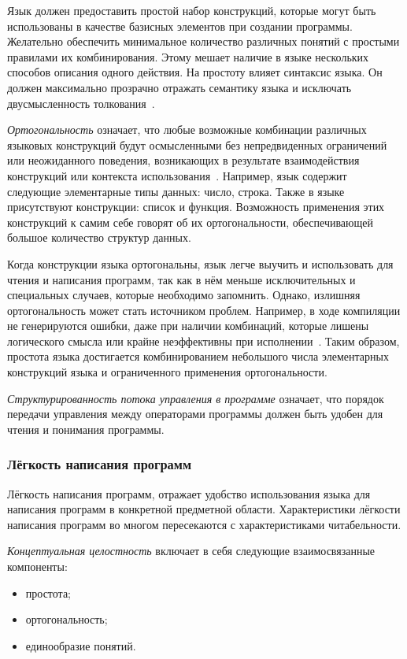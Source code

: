             Язык должен предоставить простой набор конструкций, которые могут быть использованы в качестве базисных элементов при создании программы.
            Желательно обеспечить минимальное количество различных понятий с простыми правилами их комбинирования.
            Этому мешает наличие в языке нескольких способов описания одного действия.
            На простоту влияет синтаксис языка.
            Он должен максимально прозрачно отражать семантику языка и исключать двусмысленность толкования~\cite{langs}.

            \textit{Ортогональность} означает, что любые возможные комбинации различных языковых конструкций будут осмысленными без непредвиденных ограничений или неожиданного поведения, возникающих в результате взаимодействия конструкций или контекста использования~\cite{langs}.
            Например, язык содержит следующие элементарные типы данных: число, строка.
            Также в языке присутствуют конструкции: список и функция.
            Возможность применения этих конструкций к самим себе говорят об их ортогональности, обеспечивающей большое количество структур данных.

            Когда конструкции языка ортогональны, язык легче выучить и использовать для чтения и написания программ, так как в нём меньше исключительных и специальных случаев, которые необходимо запомнить.
            Однако, излишняя ортогональность может стать источником проблем.
            Например, в ходе компиляции не генерируются ошибки, даже при наличии комбинаций, которые лишены логического смысла или крайне неэффективны при исполнении~\cite{langs}.
            Таким образом, простота языка достигается комбинированием небольшого числа элементарных конструкций языка и ограниченного применения ортогональности.

            \textit{Структурированность потока управления в программе} означает, что порядок передачи управления между операторами программы должен быть удобен для чтения и понимания программы.

        \subsubsection{Лёгкость написания программ}
            Лёгкость написания программ, отражает удобство использования языка для написания программ в конкретной предметной области.
            Характеристики лёгкости написания программ во многом пересекаются с характеристиками читабельности.

            \textit{Концептуальная целостность} включает в себя следующие взаимосвязанные компоненты:
            \begin{itemize}
                \item простота;
                \item ортогональность;
                \item единообразие понятий.
            \end{itemize}

